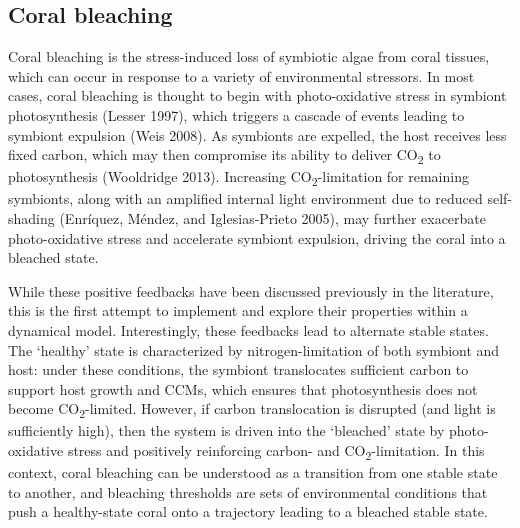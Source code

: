 \documentclass[]{elsarticle} %
\begin{document}
\subsection{Coral bleaching}\label{coral-bleaching}

Coral bleaching is the stress-induced loss of symbiotic algae from coral
tissues, which can occur in response to a variety of environmental
stressors. In most cases, coral bleaching is thought to begin with
photo-oxidative stress in symbiont photosynthesis (Lesser 1997), which
triggers a cascade of events leading to symbiont expulsion (Weis 2008).
As symbionts are expelled, the host receives less fixed carbon, which
may then compromise its ability to deliver CO\textsubscript{2} to
photosynthesis (Wooldridge 2013). Increasing
CO\textsubscript{2}-limitation for remaining symbionts, along with an
amplified internal light environment due to reduced self-shading
(Enríquez, Méndez, and Iglesias-Prieto 2005), may further exacerbate
photo-oxidative stress and accelerate symbiont expulsion, driving the
coral into a bleached state.

While these positive feedbacks have been discussed previously in the
literature, this is the first attempt to implement and explore their
properties within a dynamical model. Interestingly, these feedbacks lead
to alternate stable states. The `healthy' state is characterized by
nitrogen-limitation of both symbiont and host: under these conditions,
the symbiont translocates sufficient carbon to support host growth and
CCMs, which ensures that photosynthesis does not become
CO\textsubscript{2}-limited. However, if carbon translocation is
disrupted (and light is sufficiently high), then the system is driven
into the `bleached' state by photo-oxidative stress and positively
reinforcing carbon- and CO\textsubscript{2}-limitation. In this context,
coral bleaching can be understood as a transition from one stable state
to another, and bleaching thresholds are sets of environmental
conditions that push a healthy-state coral onto a trajectory leading to
a bleached stable state.
\end{document}
